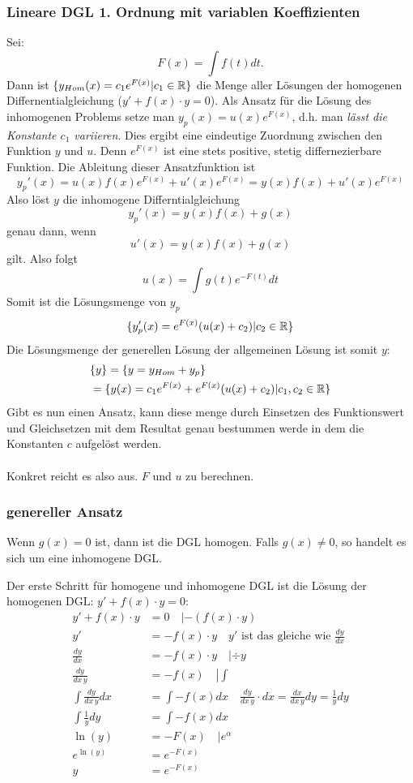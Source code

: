 \subsubsection{Lineare DGL 1. Ordnung mit variablen Koeffizienten}
Sei:\[
F(x) = \int f(t) dt.
\]
Dann ist $\{y_{Hom}(x) = c_1e^{F(x)}| c_1 \in \mathbb{R}\}$ die Menge aller Lösungen der homogenen Differnentialgleichung ($y' + f(x) \cdot y = 0$). Als Ansatz für die Lösung des inhomogenen Problems setze man $y_p(x) = u(x)e^{F(x)}$, d.h. man \textit{lässt die Konstante $c_1$ variieren}. Dies ergibt eine eindeutige Zuordnung zwischen den Funktion $y$ und $u$. Denn $e^{F(x)}$ ist eine stets positive, stetig differnezierbare Funktion. Die Ableitung dieser Ansatzfunktion ist \[
y_p'(x) = u(x)f(x)e^{F(x)} + u'(x)e^{F(x)} = y(x)f(x) + u'(x)e^{F(x)}
\]
Also löst $y$ die inhomogene Differntialgleichung \[
y_p'(x) = y(x)f(x) + g(x)
\]
genau dann, wenn\[
u'(x) = y(x)f(x) + g(x)
\]
gilt. Also folgt\[
u(x) = \int  g(t)e^{-F(t)} dt
\]
Somit ist die Lösungsmenge von $y_p$
\[
\{ y_p'(x) = e^{F(x)} (u(x) + c_2) | c_2 \in \mathbb{R} \}
\]
Die Lösungsmenge der generellen Lösung der allgemeinen Lösung ist somit $y$:
\begin{align*}
&\{y\}=\{y = y_{Hom} + y_p\}\\
& =\{ y(x) =  c_1e^{F(x)} +  e^{F(x)} (u(x) + c_2) | c_1, c_2 \in \mathbb{R}\} 
\end{align*}
Gibt es nun einen Ansatz, kann diese menge durch Einsetzen des Funktionswert und Gleichsetzen mit dem Resultat genau bestummen werde in dem die Konstanten $c$  aufgelöst werden.\\
\\
Konkret reicht es also aus. $F$ und $u$ zu berechnen. 

\subsubsection{genereller Ansatz}
Wenn $g(x) = 0$ ist, dann ist die DGL homogen. Falls $g(x) \neq 0$, so handelt
es sich um eine inhomogene DGL.

Der erste Schritt für homogene und inhomogene DGL ist die Lösung der homogenen
DGL: $y' + f(x) \cdot y = 0$:
{\small
\begin{align*}
y' + f(x) \cdot y &= 0 \quad \left | -(f(x) \cdot y) \right.\\
y' &= -f(x) \cdot y \quad \boxed{y' \text{ ist das gleiche wie } \frac{dy}{dx}}\\
\frac{dy}{dx} &= -f(x) \cdot y \quad \left | \div y \right.\\
\frac{dy}{dx\, y} &= -f(x) \quad \left | \int \right.\\
\int \frac{dy}{dx\, y} dx &= \int -f(x) dx \quad \boxed{\frac{dy}{dx\, y} \cdot dx = \frac{dx}{dx\, y} dy = \frac{1}{y} dy}\\
\int \frac{1}{y} dy &= \int -f(x) dx\\
\ln(y) &= -F(x) \quad \left | e^\alpha \right.\\
e^{\ln(y)} &= e^{-F(x)}\\
y &= e^{-F(x)}
\end{align*}
}

